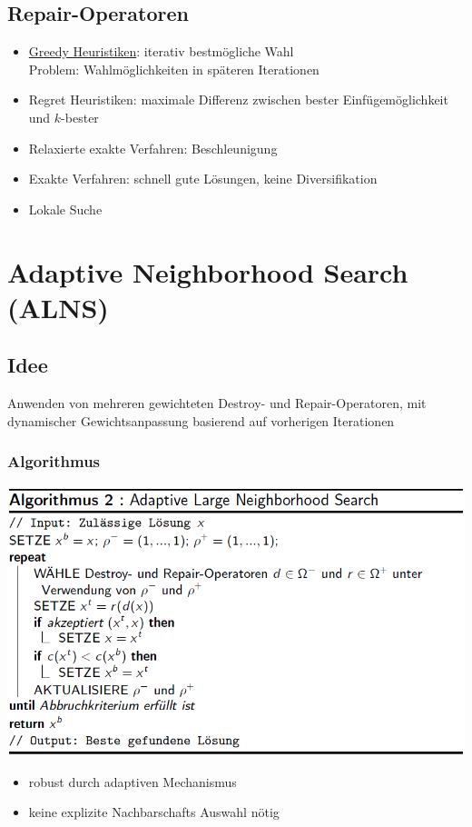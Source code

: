 \documentclass[12pt]{article}
\begin{document}
		\subsection{Repair-Operatoren}
			\begin{itemize}
				\item \hyperref[greedy]{Greedy Heuristiken}: iterativ bestmögliche Wahl \\
					Problem: Wahlmöglichkeiten in späteren Iterationen
				\item Regret Heuristiken: maximale Differenz zwischen bester Einfügemöglichkeit und $k$-bester
				\item Relaxierte exakte Verfahren: Beschleunigung
				\item Exakte Verfahren: schnell gute Lösungen, keine Diversifikation
				\item Lokale Suche
			\end{itemize}
	\section{Adaptive Neighborhood Search (ALNS)}
		\subsection{Idee}
			Anwenden von mehreren gewichteten Destroy- und Repair-Operatoren, mit dynamischer Gewichtsanpassung basierend auf vorherigen Iterationen
		\subsubsection{Algorithmus}
			\includegraphics[scale=0.6]{ALNS}
			\begin{itemize}
				\item robust durch adaptiven Mechanismus
				\item keine explizite Nachbarschafts Auswahl nötig
			\end{itemize}
\end{document}
